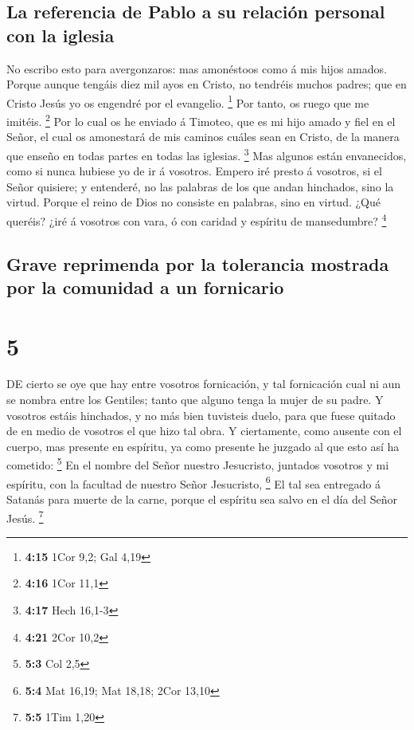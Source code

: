 \hypertarget{la-referencia-de-pablo-a-su-relaciuxf3n-personal-con-la-iglesia}{%
\subsection{La referencia de Pablo a su relación personal con la
iglesia}\label{la-referencia-de-pablo-a-su-relaciuxf3n-personal-con-la-iglesia}}

 No escribo esto para avergonzaros: mas amonéstoos como á
mis hijos amados.  Porque aunque tengáis diez mil ayos en
Cristo, no tendréis muchos padres; que en Cristo Jesús yo os engendré
por el evangelio. \footnote{\textbf{4:15} 1Cor 9,2; Gal 4,19}
 Por tanto, os ruego que me imitéis. \footnote{\textbf{4:16}
  1Cor 11,1}  Por lo cual os he enviado á Timoteo, que es
mi hijo amado y fiel en el Señor, el cual os amonestará de mis caminos
cuáles sean en Cristo, de la manera que enseño en todas partes en todas
las iglesias. \footnote{\textbf{4:17} Hech 16,1-3}  Mas
algunos están envanecidos, como si nunca hubiese yo de ir á vosotros.
 Empero iré presto á vosotros, si el Señor quisiere; y
entenderé, no las palabras de los que andan hinchados, sino la virtud.
 Porque el reino de Dios no consiste en palabras, sino en
virtud.  ¿Qué queréis? ¿iré á vosotros con vara, ó con
caridad y espíritu de mansedumbre? \footnote{\textbf{4:21} 2Cor 10,2}

\hypertarget{grave-reprimenda-por-la-tolerancia-mostrada-por-la-comunidad-a-un-fornicario}{%
\subsection{Grave reprimenda por la tolerancia mostrada por la comunidad
a un
fornicario}\label{grave-reprimenda-por-la-tolerancia-mostrada-por-la-comunidad-a-un-fornicario}}

\hypertarget{section-4}{%
\section{5}\label{section-4}}

 DE cierto se oye que hay entre vosotros fornicación, y tal
fornicación cual ni aun se nombra entre los Gentiles; tanto que alguno
tenga la mujer de su padre.  Y vosotros estáis hinchados, y
no más bien tuvisteis duelo, para que fuese quitado de en medio de
vosotros el que hizo tal obra.  Y ciertamente, como ausente
con el cuerpo, mas presente en espíritu, ya como presente he juzgado al
que esto así ha cometido: \footnote{\textbf{5:3} Col 2,5} 
En el nombre del Señor nuestro Jesucristo, juntados vosotros y mi
espíritu, con la facultad de nuestro Señor Jesucristo, \footnote{\textbf{5:4}
  Mat 16,19; Mat 18,18; 2Cor 13,10}  El tal sea entregado á
Satanás para muerte de la carne, porque el espíritu sea salvo en el día
del Señor Jesús. \footnote{\textbf{5:5} 1Tim 1,20}

